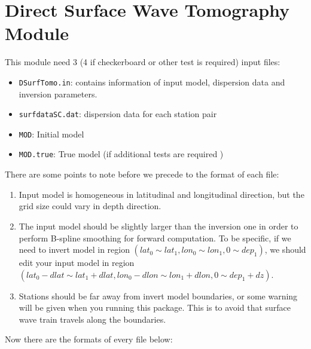 \documentclass[UTF8]{article}
\begin{document}
     \section{Direct Surface Wave Tomography Module}
     This module need 3 (4 if checkerboard or other test is required) input files:
     \begin{itemize}
        \item \verb!DSurfTomo.in!: contains information of input model, dispersion data and inversion parameters.
        \item \verb!surfdataSC.dat!: dispersion data for each station pair
        \item \verb!MOD!: Initial model
        \item \verb!MOD.true!: True model (if additional tests are required )
    \end{itemize}
    There are some points to note before we precede to the format of each file:
    \begin{enumerate}[(1)]
         \item Input model is homogeneous in latitudinal and longitudinal direction, but 
                the grid size could vary in depth direction.
        \item The input model should be slightly larger than the inversion one in order to 
              perform B-spline smoothing for forward computation. To be specific,
              if we need to invert model in region $(lat_0 \sim lat_1,lon_0\sim lon_1,0\sim dep_1)$, 
              we should edit your input model in region $(lat_0-dlat \sim lat_1+dlat, lon_0-dlon \sim lon_1+dlon,0 \sim dep_1+dz)$.
         \item Stations should be far away from invert model boundaries, or some warning will be given 
              when you running this package. This is to avoid that surface wave train travels 
                along the boundaries.
    \end{enumerate}
    Now there are the formats of every file below:
\end{document}
